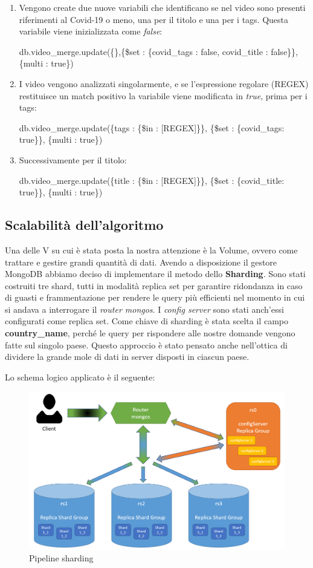 \documentclass[10pt, a4paper,openany]{article}
\begin{document}
	\begin{enumerate}
		\item Vengono create due nuove variabili che identificano se nel video sono presenti riferimenti al Covid-19 o meno, una per il titolo e una per i tags. Questa variabile viene inizializzata come \textit{false}:
		
			db.video\_merge.update(\{\},\{\$set : \{covid\_tags : false, covid\_title : false\}\},\{multi : true\})
		
		\item I video vengono analizzati singolarmente, e se l'espressione regolare (REGEX) restituisce un match positivo la variabile viene modificata in \textit{true}, prima per i tags:
		
			db.video\_merge.update(\{tags : \{\$in : [REGEX]\}\}, \{\$set : \{covid\_tags: true\}\}, \{multi : true\})
		
		\item Successivamente per il titolo:
		
			db.video\_merge.update(\{title : \{\$in : [REGEX]\}\}, \{\$set : \{covid\_title: true\}\}, \{multi : true\})
	\end{enumerate}

\subsection*{Scalabilità dell'algoritmo}

Una delle V su cui è stata posta la nostra attenzione è la Volume, ovvero come trattare e gestire grandi quantità di dati. Avendo a disposizione il gestore MongoDB abbiamo deciso di implementare il metodo dello \textbf{Sharding}.
Sono stati costruiti tre shard, tutti in modalità replica set per garantire ridondanza in caso di guasti e frammentazione per rendere le query più efficienti nel momento in cui si andava a interrogare il \textit{router mongos}. I \textit{config server} sono stati anch'essi configurati come replica set. Come chiave di sharding è stata scelta il campo \textbf{country\_name}, perché le query per rispondere alle nostre domande vengono fatte sul singolo paese. Questo approccio è stato pensato anche nell'ottica di dividere la grande mole di dati in server disposti in ciascun paese. 

Lo schema logico applicato è il seguente:
\begin{figure}[H]
	\centering
	\includegraphics[width=0.8\linewidth]{pics/sharding.png}
	\caption{Pipeline sharding}
\end{figure}
\end{document}
